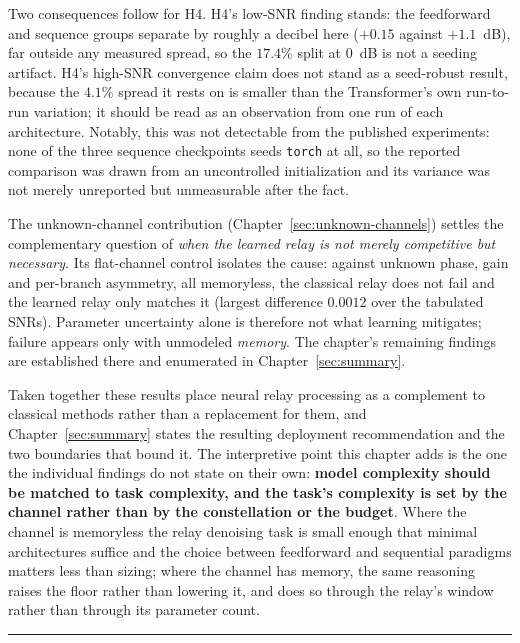 Two consequences follow for H4. H4's low-SNR finding stands: the feedforward and sequence groups separate by roughly a decibel here ($+0.15$ against $+1.1$~dB), far outside any measured spread, so the $17.4\%$ split at 0~dB is not a seeding artifact. H4's high-SNR convergence claim does not stand as a seed-robust result, because the $4.1\%$ spread it rests on is smaller than the Transformer's own run-to-run variation; it should be read as an observation from one run of each architecture. Notably, this was not detectable from the published experiments: none of the three sequence checkpoints seeds \texttt{torch} at all, so the reported comparison was drawn from an uncontrolled initialization and its variance was not merely unreported but unmeasurable after the fact.

The unknown-channel contribution (Chapter~\ref{sec:unknown-channels}) settles the complementary question of \emph{when the learned relay is not merely competitive but necessary}. Its flat-channel control isolates the cause: against unknown phase, gain and per-branch asymmetry, all memoryless, the classical relay does not fail and the learned relay only matches it (largest difference $0.0012$ over the tabulated SNRs). Parameter uncertainty alone is therefore not what learning mitigates; failure appears only with unmodeled \emph{memory}. The chapter's remaining findings are established there and enumerated in Chapter~\ref{sec:summary}.

Taken together these results place neural relay processing as a complement to classical methods rather than a replacement for them, and Chapter~\ref{sec:summary} states the resulting deployment recommendation and the two boundaries that bound it. The interpretive point this chapter adds is the one the individual findings do not state on their own: \textbf{model complexity should be matched to task complexity, and the task's complexity is set by the channel rather than by the constellation or the budget}. Where the channel is memoryless the relay denoising task is small enough that minimal architectures suffice and the choice between feedforward and sequential paradigms matters less than sizing; where the channel has memory, the same reasoning raises the floor rather than lowering it, and does so through the relay's window rather than through its parameter count.

\begin{center}\rule{0.5\linewidth}{0.5pt}\end{center}
